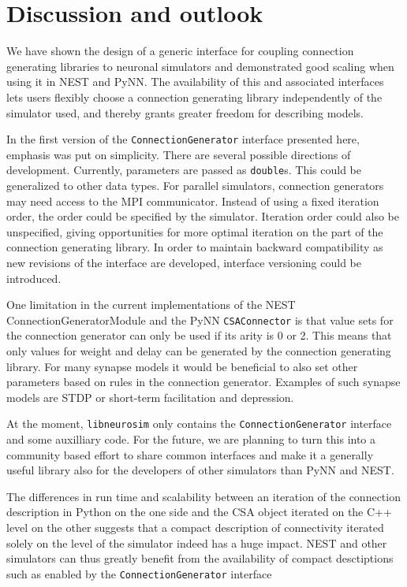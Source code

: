 \documentclass{frontiersSCNS} %
\begin{document}

\section{Discussion and outlook}

We have shown the design of a generic interface for coupling
connection generating libraries to neuronal simulators and
demonstrated good scaling when using it in NEST and PyNN. The
availability of this and associated interfaces lets users flexibly
choose a connection generating library independently of the simulator
used, and thereby grants greater freedom for describing models.

In the first version of the \verb|ConnectionGenerator| interface
presented here, emphasis was put on simplicity. There are several
possible directions of development. Currently, parameters are passed
as \verb|double|s. This could be generalized to other data types.  For
parallel simulators, connection generators may need access to the MPI
communicator.  Instead of using a fixed iteration order, the order
could be specified by the simulator. Iteration order could also be
unspecified, giving opportunities for more optimal iteration on the
part of the connection generating library.  In order to maintain
backward compatibility as new revisions of the interface are
developed, interface versioning could be introduced.

One limitation in the current implementations of the NEST
ConnectionGeneratorModule and the PyNN \verb|CSAConnector| is that
value sets for the connection generator can only be used if its arity
is 0 or 2. This means that only values for weight and delay can be
generated by the connection generating library. For many synapse
models it would be beneficial to also set other parameters based on
rules in the connection generator. Examples of such synapse models are
STDP or short-term facilitation and depression.

At the moment, \verb|libneurosim| only contains the
\verb|ConnectionGenerator| interface and some auxilliary code. For the
future, we are planning to turn this into a community based effort to
share common interfaces and make it a generally useful library also
for the developers of other simulators than PyNN and NEST.

The differences in run time and scalability between an iteration of
the connection description in Python on the one side and the CSA
object iterated on the C++ level on the other suggests that a compact
description of connectivity iterated solely on the level of the
simulator indeed has a huge impact. NEST and other simulators can thus
greatly benefit from the availability of compact desctiptions such as
enabled by the \verb|ConnectionGenerator| interface
\end{document}
